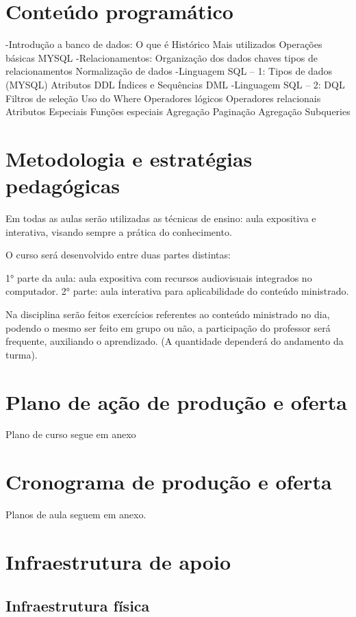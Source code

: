 \section{Conteúdo programático}

-Introdução a banco de dados:
O que é
Histórico
Mais utilizados
Operações básicas MYSQL
-Relacionamentos:
Organização dos dados
chaves
tipos de relacionamentos
Normalização de dados
-Linguagem SQL – 1:
Tipos de dados (MYSQL)
Atributos
DDL
Índices e Sequências
DML
-Linguagem SQL – 2:
DQL
Filtros de seleção
Uso do Where
Operadores lógicos
Operadores relacionais
Atributos Especiais
Funções especiais
Agregação
Paginação
Agregação
Subqueries


\newpage
\section{Metodologia e estratégias pedagógicas}

Em todas as aulas serão utilizadas as técnicas de ensino: aula expositiva e interativa, visando sempre a prática do conhecimento.

O curso será desenvolvido entre duas partes distintas:

1° parte da aula: aula expositiva com recursos audiovisuais integrados no computador.
2° parte: aula interativa para aplicabilidade do conteúdo ministrado.

Na disciplina serão feitos exercícios referentes ao conteúdo ministrado no dia, podendo o mesmo ser feito em grupo ou não, a participação do professor será frequente, auxiliando o aprendizado. (A quantidade dependerá do andamento da turma).


\section{Plano de ação de produção e oferta}

Plano de curso segue em anexo

\section{Cronograma de produção e oferta}

Planos de aula seguem em anexo.

\section{Infraestrutura de apoio}

\subsection{Infraestrutura física}

